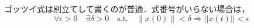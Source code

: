 \documentclass[lualatex,a4paper,ja = standard, twoside, twocolumn]{bxjsarticle}
\begin{document}
  \par ゴッツイ式は別立てして書くのが普通．式番号がいらない場合は，
    \[
      \forall \epsilon > 0 \quad \exists \delta > 0 \quad
      \text{s.t.} \quad
        \|x(0)\| < \delta \Rightarrow ||x(t)|| < \epsilon
    \]
\end{document}
